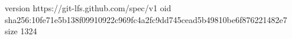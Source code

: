 version https://git-lfs.github.com/spec/v1
oid sha256:10fe71e5b138f09910922c969fc4a2fc9dd745cead5b49810be6f876221482e7
size 1324
